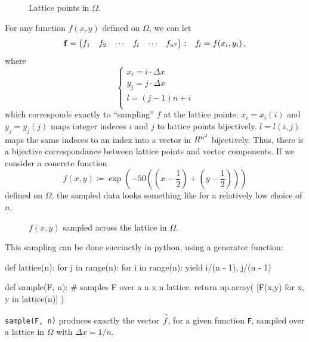 \documentclass[12pt]{article}
\begin{document}
\begin{multicols}{2}
    \begin{figure}[H]
        \centering
        
        \caption{
            Lattice points in $\Omega$.
        }
        \label{fig:omega}
    \end{figure}\noindent
    For any function $f(x, y)$ defined on $\Omega$, we can let
    \[
        \vec f = \begin{pmatrix}
            f_1 & f_2 & \cdots & f_l & \cdots & f_{n^2}
        \end{pmatrix}
        \,\text; \quad
        f_l = f(x_i, y_i) \,\text,
    \]
    where
    \[
        \left\{\begin{array}{l}
            x_i = i \cdot \Delta x \\
            y_j = j \cdot \Delta x \\
            l = \left(j - 1\right)n + i \\
        \end{array}\right.
    \]
    which corresponds exactly to ``sampling'' $f$ at the lattice points:
    $x_i = x_i(i)$ and $y_j = y_j(j)$ maps integer indeces $i$ and $j$
    to lattice points bijectively.
    $l = l(i,j)$ maps the same indeces to an index into a vector in $\R^{n^2}$
    bijectively.
    Thus, there is a bijective correspondance between lattice points
    and vector components.
    If we consider a concrete function
    \[
        f(x, y) \coloneqq \exp{\left(
            -50 \left(
                \left(x - \frac{1}{2}\right)
                + \left(y - \frac{1}{2}\right)
            \right)
        \right)}
    \]
    defined on $\Omega$, the sampled data looks something like
     for a relatively low choice of $n$.
    \begin{figure}[H]
        \centering
        
        \caption{
            $f(x, y)$ sampled across the lattice in $\Omega$.
        }
        \label{fig:sample}
    \end{figure}\noindent
    This sampling can be done succinctly in python, using
    a generator function:
    \begin{python}[
        caption={Program to sample functions over lattices}
    ]
def lattice(n):
    for j in range(n):
        for i in range(n):
            yield i/(n - 1), j/(n - 1)

def sample(F, n):
    # samples F over a n x n lattice.
    return np.array(
        [F(x,y) for x, y in lattice(n)]
    )
    \end{python}
    {\tt sample(F, n)} produces exactly the vector $\vec f$,
    for a given function {\tt F}, sampled over a lattice
    in $\Omega$ with $\Delta x = 1/n$.


\end{multicols}
\end{document}
